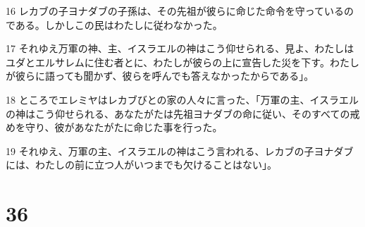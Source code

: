 \par 16 レカブの子ヨナダブの子孫は、その先祖が彼らに命じた命令を守っているのである。しかしこの民はわたしに従わなかった。
\par 17 それゆえ万軍の神、主、イスラエルの神はこう仰せられる、見よ、わたしはユダとエルサレムに住む者とに、わたしが彼らの上に宣告した災を下す。わたしが彼らに語っても聞かず、彼らを呼んでも答えなかったからである」。
\par 18 ところでエレミヤはレカブびとの家の人々に言った、「万軍の主、イスラエルの神はこう仰せられる、あなたがたは先祖ヨナダブの命に従い、そのすべての戒めを守り、彼があなたがたに命じた事を行った。
\par 19 それゆえ、万軍の主、イスラエルの神はこう言われる、レカブの子ヨナダブには、わたしの前に立つ人がいつまでも欠けることはない」。

\chapter{36}

